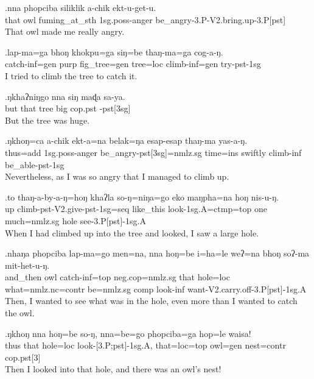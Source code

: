 \exg.nna  phopciba siliklik    a-chik           ekt-u-get-u.\\
 that owl      fuming\_at\_sth {\sc 1sg.poss-}anger be\_angry{\sc -3.P-V2.bring.up-3.P[pst]}\\
That owl made me really angry.

\exg.lap-ma=ga         bhoŋ khokpu=ga      siŋ=be    thaŋ-ma=ga       cog-a-ŋ.\\
 catch{\sc -inf=gen} {\sc purp} fig\_tree{\sc =gen} tree{\sc =loc} climb{\sc -inf=gen} try{\sc -pst-1sg}\\
I tried to climb the tree to catch it.

\exg.ŋkhaʔniŋgo nna  siŋ maɖa sa-ya.\\
 but           that tree big   {\sc cop.pst -pst[3sg]}\\
But the tree was huge.

\exg.ŋkhoŋ=ca        a-chik           ekt-a=na                        belak=ŋa  esap-esap thaŋ-ma    yas-a-ŋ.\\
 thus{\sc =add} {\sc 1sg.poss-}anger be\_angry{\sc -pst[3sg]=nmlz.sg} time{\sc =ins} swiftly   climb{\sc -inf} be\_able{\sc -pst-1sg}\\
Nevertheless, as I was so angry that I managed to climb up.

\exg.to  thaŋ-a-by-a-ŋ=hoŋ                       khaʔla   so-ŋ=niŋa=go              eko maŋpha=na        hoŋ nis-u-ŋ.\\
 up  climb{\sc -pst-V2.give-pst-1sg=seq}  like\_this look{\sc -1sg.A=ctmp=top}  one much{\sc =nmlz.sg} hole see{\sc -3.P[pst]-1sg.A}\\
When I had climbed up into the tree and looked, I saw a large hole.

\exg.nhaŋa   phopciba lap-ma=go          men=na,            nna  hoŋ=be    i=ha=le                         weʔ=na        bhoŋ soʔ-ma    mit-het-u-ŋ.\\
 and\_then owl      catch{\sc -inf=top}  {\sc neg.cop=nmlz.sg} that hole{\sc =loc} what{\sc =nmlz.nc=contr} be{\sc [3sg]=nmlz.sg} {\sc comp}  look{\sc -inf} want{\sc -V2.carry.off-3.P[pst]-1sg.A}\\
Then, I wanted to see what was in the hole, even more than I wanted to catch the owl.

\exg.ŋkhoŋ nna  hoŋ=be    so-ŋ, nna=be=go         phopciba=ga    hop=le           waisa!\\
 thus    that hole{\sc =loc} look{\sc -[3.P;pst]-1sg.A,} that{\sc =loc=top}  owl{\sc =gen} nest{\sc =contr} {\sc cop.pst[3]}\\
Then I looked into that hole, and there was an owl's nest!


